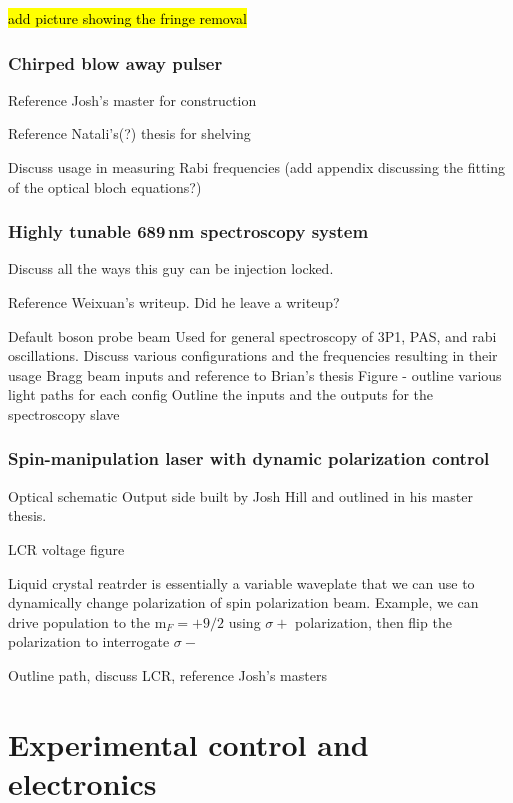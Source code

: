 \hl{add picture showing the fringe removal}

\subsubsection{Chirped blow away pulser}



Reference Josh's master for construction

Reference Natali's(?) thesis for shelving

Discuss usage in measuring Rabi frequencies (add appendix discussing the fitting of the optical bloch equations?)

\subsubsection{Highly tunable 689\,nm spectroscopy system}

Discuss all the ways this guy can be injection locked.

Reference Weixuan's writeup. Did he leave a writeup?

Default boson probe beam
	Used for general spectroscopy of 3P1, PAS, and rabi oscillations.
Discuss various configurations and the frequencies resulting in their usage
Bragg beam inputs and reference to Brian’s thesis
Figure - outline various light paths for each config
Outline the inputs and the outputs for the spectroscopy slave


\subsubsection{Spin-manipulation laser with dynamic polarization control}

Optical schematic
Output side built by Josh Hill and outlined in his master thesis.

LCR voltage figure

Liquid crystal reatrder is essentially a variable waveplate that we can use to dynamically change polarization of spin polarization beam.
Example, we can drive population to the m$_F=+9/2$ using $\sigma+$ polarization, then flip the polarization to interrogate $\sigma-$

Outline path, discuss LCR, reference Josh's masters

\section{Experimental control and electronics} \label{sec:electronics}

